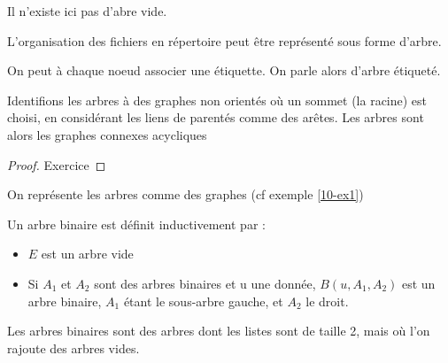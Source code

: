 \begin{rem}
	Il n'existe ici pas d'abre vide.
\end{rem}

\begin{example}
	L'organisation des fichiers en répertoire peut être représenté sous forme d'arbre.
\end{example}

\begin{rem}
	On peut à chaque noeud associer une étiquette. On parle alors d'arbre étiqueté.
\end{rem}

\begin{theorem}
	Identifions les arbres à des graphes non orientés où un sommet (la racine) est choisi, en considérant les liens de parentés comme des arêtes. Les arbres sont alors les graphes connexes acycliques
	\label{10-graphe}
\end{theorem}
\begin{proof}
	Exercice
\end{proof}

\begin{corollary}
	On représente les arbres comme des graphes (cf exemple \ref{10-ex1})
\end{corollary}

\begin{definition}
	Un arbre binaire est définit inductivement par :
	\begin{itemize}
		\item $E$ est un arbre vide
		\item Si $A_1$ et $A_2$ sont des arbres binaires et u une donnée, $B(u, A_1, A_2)$ est un arbre binaire, $A_1$ étant le sous-arbre gauche, et $A_2$ le droit.
	\end{itemize}
\end{definition}

\begin{idee}
	Les arbres binaires sont des arbres dont les listes sont de taille 2, mais où l'on rajoute des arbres vides.
\end{idee}

